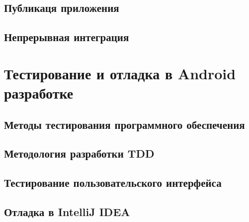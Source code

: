 \subsection{Публикаця приложения}
\label{subsec:publish}

\subsection{Непрерывная интеграция}
\label{subsec:ci}


\section{Тестирование и отладка в Android разработке}
\label{sec:testing}

\subsection{Методы тестирования программного обеспечения}
\label{subsec:testing:methods}

\subsection{Методология разработки TDD}
\label{subsec:testing:tdd}

\subsection{Тестирование пользовательского интерфейса}
\label{subsec:testing:ui}

\subsection{Отладка в IntelliJ IDEA}
\label{subsec:debug}

